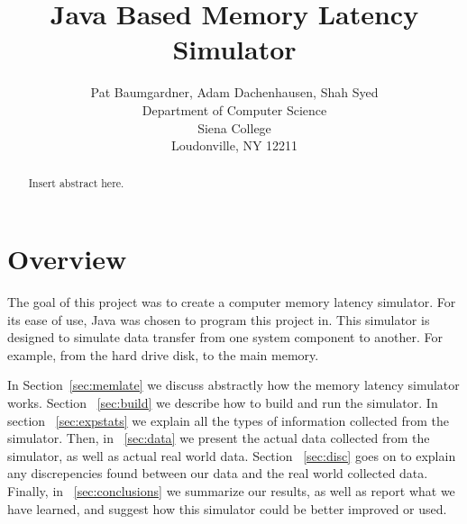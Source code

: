 \documentclass[12pt]{article}
\newcommand{\doublespace}{
  \protect\renewcommand\baselinestretch{1.5}
  \protect\normalsize
}
\begin{document}
\date{}

\title{Java Based Memory Latency Simulator}

\author{Pat Baumgardner, Adam Dachenhausen, Shah Syed\\
Department of Computer Science\\
Siena College\\
Loudonville, NY  12211
}

\maketitle
\thispagestyle{empty}

\begin{abstract}

Insert abstract here.
  
\end{abstract}

\doublespace

\section{Overview}
\label{sec:overview}

The goal of this project was to create a computer memory latency simulator. 
For its ease of use, Java was chosen to program this project in. This 
simulator is designed to simulate data transfer from one system component 
to another. For example, from the hard drive disk, to the main memory. 

In Section~\ref{sec:memlate} we discuss abstractly how the memory latency 
simulator works. Section ~\ref{sec:build} we describe how to build and run the 
simulator. In section ~\ref{sec:expstats} we explain all the types of 
information collected from the simulator. Then, in ~\ref{sec:data} we 
present the actual data collected from the simulator, as well as actual 
real world data. Section ~\ref{sec:disc} goes on to explain any discrepencies 
found between our data and the real world collected data. Finally, in
~\ref{sec:conclusions} we summarize our results, as well as report what
we have learned, and suggest how this simulator could be better
improved or used. 
\end{document}
